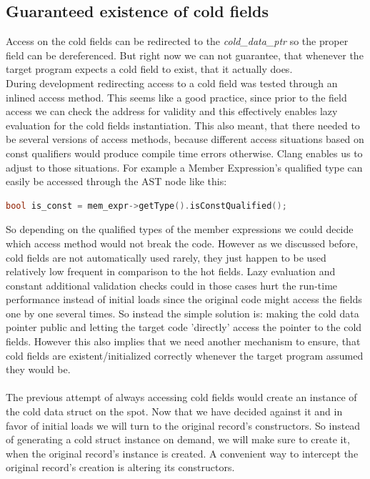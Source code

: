 \subsection{Guaranteed existence of cold fields }
Access on the cold fields can be redirected to the \textit{cold\_data\_ptr} so the proper field can be dereferenced. But right now we can not guarantee, that whenever the target program expects a cold field to exist, that it actually does.\\
During development redirecting access to a cold field was tested through an inlined access method. This seems like a good practice, since prior to the field access we can check the address for validity and this effectively enables lazy evaluation for the cold fields instantiation. This also meant, that there needed to be several versions of access methods, because different access situations based on const qualifiers would produce compile time errors otherwise. Clang enables us to adjust to those situations. For example a Member Expression's qualified type can easily be accessed through the AST node like this:
\begin{lstlisting}[language=C++, numbers=none, name={Retrieving type information from a clang::MemExpr pointer.}]
	bool is_const = mem_expr->getType().isConstQualified();
\end{lstlisting}
So depending on the qualified types of the member expressions we could decide which access method would not break the code. However as we discussed before, cold fields are not automatically used rarely, they just happen to be used relatively low frequent in comparison to the hot fields. Lazy evaluation and constant additional validation checks could in those cases hurt the run-time performance instead of initial loads since the original code might access the fields one by one several times. So instead the simple solution is: making the cold data pointer public and letting the target code 'directly' access the pointer to the cold fields. However this also implies that we need another mechanism to ensure, that cold fields are existent/initialized correctly whenever the target program assumed they would be.\\\\
The previous attempt of always accessing cold fields would create an instance of the cold data struct on the spot. Now that we have decided against it and in favor of initial loads we will turn to the original record's constructors. So instead of generating a cold struct instance on demand, we will make sure to create it, when the original record's instance is created. A convenient way to intercept the original record's creation is altering its constructors.\\
